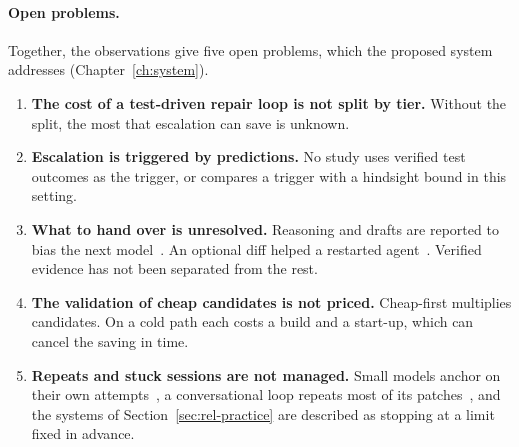 \paragraph{Open problems.} Together, the observations give five open problems,
which the proposed system addresses (Chapter~\ref{ch:system}).
\begin{enumerate}[label=\textbf{O\arabic*}]
\item \textbf{The cost of a test-driven repair loop is not split by tier.}
Without the split, the most that escalation can save is unknown.
\item \textbf{Escalation is triggered by predictions.} No study uses verified
test outcomes as the trigger, or compares a trigger with a hindsight bound in
this setting.
\item \textbf{What to hand over is unresolved.} Reasoning and drafts are
reported to bias the next
model~\citep{son2026swerouter,ning2026revision}. An optional diff helped a
restarted agent~\citep{wang2026failfast}. Verified evidence has not been
separated from the rest.
\item \textbf{The validation of cheap candidates is not priced.} Cheap-first
multiplies candidates. On a cold path each costs a build and a start-up, which
can cancel the saving in time.
\item \textbf{Repeats and stuck sessions are not managed.} Small models anchor
on their own attempts~\citep{verma2026blind}, a conversational loop repeats
most of its patches~\citep{chen2025conversational}, and the systems of
Section~\ref{sec:rel-practice} are described as stopping at a limit fixed in
advance.
\end{enumerate}
